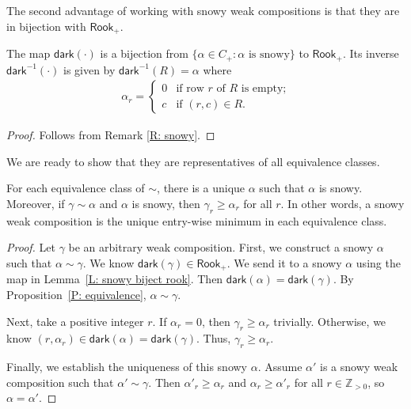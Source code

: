 \documentclass[ALCO]{cedram}
\newenvironment{manuallemma}[1]{
  \renewcommand\themanuallemmainner{#1}
  \manuallemmainner
}{\endmanuallemmainner}
\newcommand{\Z}{\mathbb{Z}}
\newcommand{\dark}{\mathsf{dark}}
\newcommand{\Rook}{\mathsf{Rook}}
\begin{document}
The second advantage of working with snowy weak compositions is that
they are in bijection with $\Rook_+$.

\begin{lem}
\label{L: snowy biject rook}
The map $\dark(\cdot)$ is a bijection
from $\{ \alpha \in C_+: \alpha \textrm{ is snowy}\}$
to $\Rook_+$.
Its inverse $\dark^{-1}(\cdot)$ 
is given by $\dark^{-1}(R) = \alpha$
where \begin{align*}
\alpha_r =
\begin{cases}
0 &\text{if row $r$ of $R$ is empty;} \\
c &\text{if $(r,c) \in R$.} 
\end{cases}
\end{align*}
\end{lem}
\begin{proof}
Follows from Remark \ref{R: snowy}.
\end{proof}

We are ready to show that they are representatives of all equivalence classes.

\begin{manuallemma}{\ref{L: snowy weak composition in equivalence class}}
For each equivalence class of $\sim$, 
there is a unique $\alpha$ such that $\alpha$ is snowy. 
Moreover, if $\gamma \sim \alpha$ and $\alpha$ is snowy, 
then $\gamma_r \geqslant \alpha_r$ for all $r$.
In other words, a snowy weak composition is the
unique entry-wise minimum in each equivalence class. 
\end{manuallemma}
\begin{proof}
Let $\gamma$ be an arbitrary weak composition. 
First, we construct a snowy $\alpha$ 
such that $\alpha \sim \gamma$.
We know $\dark(\gamma) \in \Rook_+$.
We send it to a snowy $\alpha$
using the map in Lemma~\ref{L: snowy biject rook}.
Then $\dark(\alpha) = \dark(\gamma)$.
By Proposition~\ref{P: equivalence},
$\alpha \sim \gamma$.

Next, take a positive integer $r$.
If $\alpha_r = 0$, then $\gamma_r \geqslant \alpha_r$ trivially.
Otherwise, we know $(r, \alpha_r) \in \dark(\alpha) = \dark(\gamma)$.
Thus, $\gamma_r \geqslant \alpha_r$.

Finally, we establish the uniqueness of this snowy $\alpha$.
Assume $\alpha'$ is a snowy weak composition
such that $\alpha' \sim \gamma$.
Then $\alpha'_r \geqslant \alpha_r$ and $\alpha_r \geqslant \alpha'_r$
for all $r \in \Z_{>0}$, so $\alpha = \alpha'$.
\end{proof}
\end{document}
